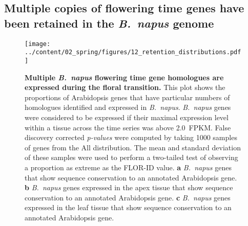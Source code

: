 \documentclass[12pt,]{book}
\begin{document}
\subsection{\texorpdfstring{Multiple copies of flowering time genes have
been retained in the \emph{B.~napus}
genome}{Multiple copies of flowering time genes have been retained in the B.~napus genome}}\label{section:spring:floweringretained}

\begin{figure}[htbp]
\centering
\texttt{[image: ../content/02\_spring/figures/12\_retention\_distributions.pdf]}
\caption{\textbf{Multiple \emph{B.~napus} flowering time gene homologues
are expressed during the floral transition.} This plot shows the
proportions of Arabidopsis genes that have particular numbers of
homologues identified and expressed in \emph{B.~napus}. \emph{B.~napus}
genes were considered to be expressed if their maximal expression level
within a tissue across the time series was above 2.0~FPKM. False
discovery corrected \emph{p-values} were computed by taking 1000 samples
of genes from the All distribution. The mean and standard deviation of
these samples were used to perform a two-tailed test of observing a
proportion as extreme as the FLOR-ID value. \textbf{a} \emph{B.~napus}
genes that show sequence conservation to an annotated Arabidopsis gene.
\textbf{b} \emph{B.~napus} genes expressed in the apex tissue that show
sequence conservation to an annotated Arabidopsis gene. \textbf{c}
\emph{B.~napus} genes expressed in the leaf tissue that show sequence
conservation to an annotated Arabidopsis
gene.}\label{figure:212:retentiondistribution}
\end{figure}
\end{document}
